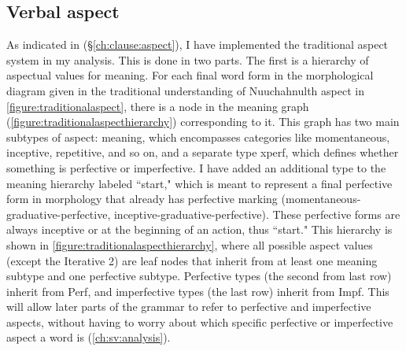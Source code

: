 \subsection{Verbal aspect} \label{ch:clause:analysis:aspect}

As indicated in (\S\ref{ch:clause:aspect}), I have implemented the traditional aspect system in my analysis. This is done in two parts. The first is a hierarchy of aspectual values for meaning. For each final word form in the morphological diagram given in the traditional understanding of Nuuchahnulth aspect in \cref{figure:traditionalaspect}, there is a node in the meaning graph (\cref{figure:traditionalaspecthierarchy}) corresponding to it. This graph has two main subtypes of aspect: meaning, which encompasses categories like momentaneous, inceptive, repetitive, and so on, and a separate type xperf, which defines whether something is perfective or imperfective. I have added an additional type to the meaning hierarchy labeled ``start," which is meant to represent a final perfective form in morphology that already has perfective marking (momentaneous-graduative-perfective, inceptive-graduative-perfective). These perfective forms are always inceptive or at the beginning of an action, thus ``start." This hierarchy is shown in \cref{figure:traditionalaspecthierarchy}, where all possible aspect values (except the Iterative 2) are leaf nodes that inherit from at least one meaning subtype and one perfective subtype. Perfective types (the second from last row) inherit from Perf, and imperfective types (the last row) inherit from Impf. This will allow later parts of the grammar to refer to perfective and imperfective aspects, without having to worry about which specific perfective or imperfective aspect a word is (\ref{ch:sv:analysis}).

